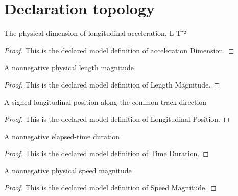 \section{Declaration topology}
\begin{definition}
  \label{def:physics:phyx-mini-0730:phyxminiproblems-problemphyxmini0730-accelerationdimension}
  The physical dimension of longitudinal acceleration, L T⁻²
\end{definition}
\begin{proof}
  This is the declared model definition of acceleration Dimension.
\end{proof}
\begin{definition}
  \label{def:physics:phyx-mini-0730:phyxminiproblems-problemphyxmini0730-lengthmagnitude}
  A nonnegative physical length magnitude
\end{definition}
\begin{proof}
  This is the declared model definition of Length Magnitude.
\end{proof}
\begin{definition}
  \label{def:physics:phyx-mini-0730:phyxminiproblems-problemphyxmini0730-longitudinalposition}
  A signed longitudinal position along the common track direction
\end{definition}
\begin{proof}
  This is the declared model definition of Longitudinal Position.
\end{proof}
\begin{definition}
  \label{def:physics:phyx-mini-0730:phyxminiproblems-problemphyxmini0730-timeduration}
  A nonnegative elapsed-time duration
\end{definition}
\begin{proof}
  This is the declared model definition of Time Duration.
\end{proof}
\begin{definition}
  \label{def:physics:phyx-mini-0730:phyxminiproblems-problemphyxmini0730-speedmagnitude}
  A nonnegative physical speed magnitude
\end{definition}
\begin{proof}
  This is the declared model definition of Speed Magnitude.
\end{proof}
